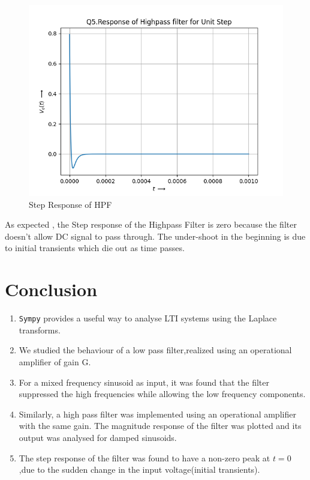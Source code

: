 \documentclass[11pt, a4paper]{article}
\begin{document}
\begin{figure}[H]
    \centering
    \includegraphics[scale=0.6]{Figure_7.png}
    \caption{Step Response of HPF}
    \label{fig:Fig7}
\end{figure}
As expected , the Step response of the Highpass Filter is zero because the filter doesn't allow DC signal to pass through. The under-shoot in the beginning is due to initial transients which die out as time passes. 


\section{Conclusion}
\begin{enumerate}
    \item \texttt{Sympy} provides a useful way to analyse LTI systems using the Laplace transforms. 
    \item  We studied the behaviour of a low pass filter,realized using an operational amplifier of gain G.
    \item   For a mixed frequency sinusoid as input,  it  was  found  that  the  filter  suppressed  the  high  frequencies  while allowing  the  low  frequency  components. 
    \item     Similarly,  a  high  pass  filter  was implemented using an operational amplifier with the same gain.  The magnitude response of the filter was plotted and its output was analysed for damped sinusoids.
    \item The step response of the filter was found to have a non-zero peak at $t= 0$ ,due to the sudden change in the input voltage(initial transients).


\end{enumerate}
\end{document}
